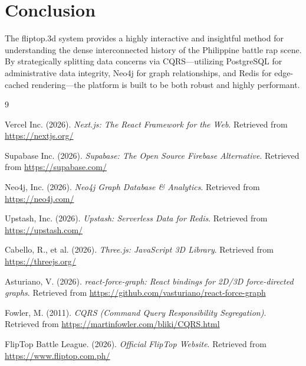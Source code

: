 \documentclass[12pt,a4paper]{article}
\begin{document}
\section{Conclusion}
The fliptop.3d system provides a highly interactive and insightful method for understanding the dense interconnected history of the Philippine battle rap scene. By strategically splitting data concerns via CQRS—utilizing PostgreSQL for administrative data integrity, Neo4j for graph relationships, and Redis for edge-cached rendering—the platform is built to be both robust and highly performant.

\begin{thebibliography}{9}

Vercel Inc. (2026). \textit{Next.js: The React Framework for the Web}. Retrieved from \url{https://nextjs.org/}

Supabase Inc. (2026). \textit{Supabase: The Open Source Firebase Alternative}. Retrieved from \url{https://supabase.com/}

Neo4j, Inc. (2026). \textit{Neo4j Graph Database \& Analytics}. Retrieved from \url{https://neo4j.com/}

Upstash, Inc. (2026). \textit{Upstash: Serverless Data for Redis}. Retrieved from \url{https://upstash.com/}

Cabello, R., et al. (2026). \textit{Three.js: JavaScript 3D Library}. Retrieved from \url{https://threejs.org/}

Asturiano, V. (2026). \textit{react-force-graph: React bindings for 2D/3D force-directed graphs}. Retrieved from \url{https://github.com/vasturiano/react-force-graph}

Fowler, M. (2011). \textit{CQRS (Command Query Responsibility Segregation)}. Retrieved from \url{https://martinfowler.com/bliki/CQRS.html}

FlipTop Battle League. (2026). \textit{Official FlipTop Website}. Retrieved from \url{https://www.fliptop.com.ph/}

\end{thebibliography}
\end{document}

